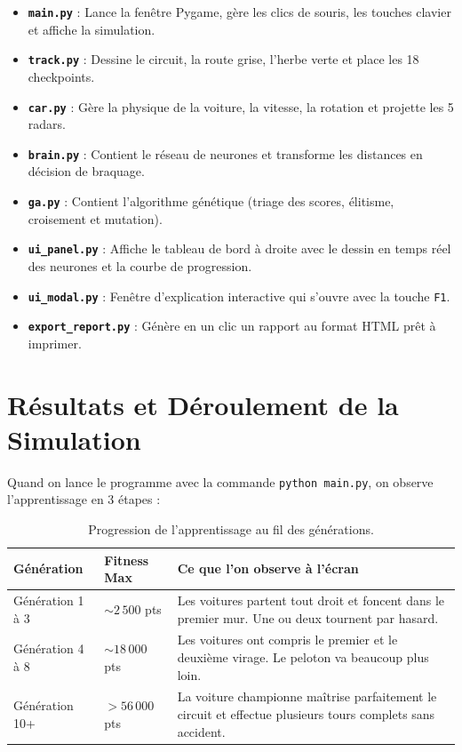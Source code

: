\documentclass[12pt,a4paper]{article}
\begin{document}
\begin{itemize}[leftmargin=*]
  \item \textbf{\texttt{main.py}} : Lance la fenêtre Pygame, gère les clics de souris, les touches clavier et affiche la simulation.
  \item \textbf{\texttt{track.py}} : Dessine le circuit, la route grise, l'herbe verte et place les 18 checkpoints.
  \item \textbf{\texttt{car.py}} : Gère la physique de la voiture, la vitesse, la rotation et projette les 5 radars.
  \item \textbf{\texttt{brain.py}} : Contient le réseau de neurones et transforme les distances en décision de braquage.
  \item \textbf{\texttt{ga.py}} : Contient l'algorithme génétique (triage des scores, élitisme, croisement et mutation).
  \item \textbf{\texttt{ui\_panel.py}} : Affiche le tableau de bord à droite avec le dessin en temps réel des neurones et la courbe de progression.
  \item \textbf{\texttt{ui\_modal.py}} : Fenêtre d'explication interactive qui s'ouvre avec la touche \texttt{F1}.
  \item \textbf{\texttt{export\_report.py}} : Génère en un clic un rapport au format HTML prêt à imprimer.
\end{itemize}

\section{Résultats et Déroulement de la Simulation}

Quand on lance le programme avec la commande \texttt{python main.py}, on observe l'apprentissage en 3 étapes :

\begin{table}[H]
\centering
\begin{tabular}{|l|l|p{8.5cm}|}
\hline
\textbf{Génération} & \textbf{Fitness Max} & \textbf{Ce que l'on observe à l'écran} \\
\hline
Génération 1 à 3 & $\sim 2\,500$ pts & Les voitures partent tout droit et foncent dans le premier mur. Une ou deux tournent par hasard. \\
\hline
Génération 4 à 8 & $\sim 18\,000$ pts & Les voitures ont compris le premier et le deuxième virage. Le peloton va beaucoup plus loin. \\
\hline
Génération 10+ & $> 56\,000$ pts & La voiture championne maîtrise parfaitement le circuit et effectue plusieurs tours complets sans accident. \\
\hline
\end{tabular}
\caption{Progression de l'apprentissage au fil des générations.}
\end{table}
\end{document}
